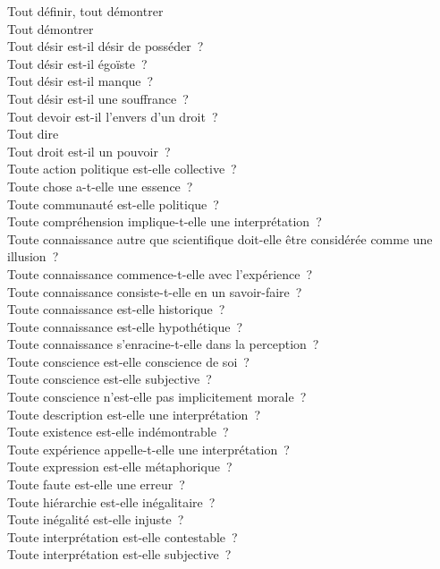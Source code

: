 \documentclass[a4paper,12pt]{article}
\begin{document}
Tout définir, tout démontrer \\
Tout démontrer \\
Tout désir est-il désir de posséder ? \\
Tout désir est-il égoïste ? \\
Tout désir est-il manque ? \\
Tout désir est-il une souffrance ? \\
Tout devoir est-il l'envers d'un droit ? \\
Tout dire \\
Tout droit est-il un pouvoir ? \\
Toute action politique est-elle collective ? \\
Toute chose a-t-elle une essence ? \\
Toute communauté est-elle politique ? \\
Toute compréhension implique-t-elle une interprétation ? \\
Toute connaissance autre que scientifique doit-elle être considérée comme une illusion ? \\
Toute connaissance commence-t-elle avec l'expérience ? \\
Toute connaissance consiste-t-elle en un savoir-faire ? \\
Toute connaissance est-elle historique ? \\
Toute connaissance est-elle hypothétique ? \\
Toute connaissance s'enracine-t-elle dans la perception ? \\
Toute conscience est-elle conscience de soi ? \\
Toute conscience est-elle subjective ? \\
Toute conscience n'est-elle pas implicitement morale ? \\
Toute description est-elle une interprétation ? \\
Toute existence est-elle indémontrable ? \\
Toute expérience appelle-t-elle une interprétation ? \\
Toute expression est-elle métaphorique ? \\
Toute faute est-elle une erreur ? \\
Toute hiérarchie est-elle inégalitaire ? \\
Toute inégalité est-elle injuste ? \\
Toute interprétation est-elle contestable ? \\
Toute interprétation est-elle subjective ? \\
\end{document}
